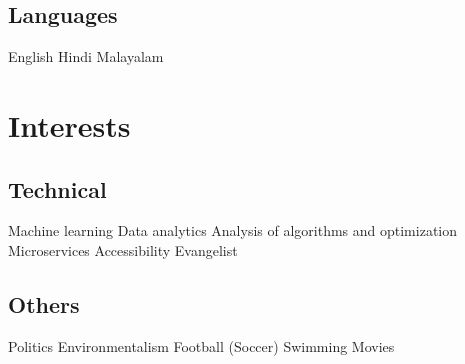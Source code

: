 \documentclass[]{deedy-resume-openfont}
\begin{document}
\begin{minipage}[t]{0.33\textwidth}
\subsection{Languages}
English \textbullet{} Hindi \textbullet{} Malayalam
\sectionsep


\section{Interests}
\subsection{Technical}
Machine learning \textbullet{} Data analytics \textbullet{} Analysis of algorithms and optimization \textbullet{} Microservices
\sectionsep Accessibility Evangelist

\subsection{Others}
Politics \textbullet{} Environmentalism \textbullet{} Football (Soccer) \textbullet{} Swimming \textbullet{} Movies 
\sectionsep



%
%

\end{minipage} 
\hfill
\end{document}
